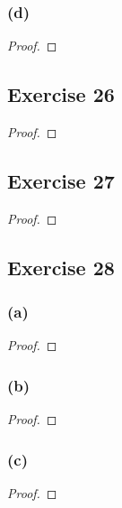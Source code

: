 \documentclass[14pt]{extarticle}
\begin{document}
\subsubsection{(d)}

\begin{proof}

\end{proof}

\subsection{Exercise 26}

\begin{proof}

\end{proof}

\subsection{Exercise 27}

\begin{proof}

\end{proof}

\subsection{Exercise 28}

\subsubsection{(a)}

\begin{proof}

\end{proof}

\subsubsection{(b)}

\begin{proof}

\end{proof}

\subsubsection{(c)}

\begin{proof}

\end{proof}
\end{document}
